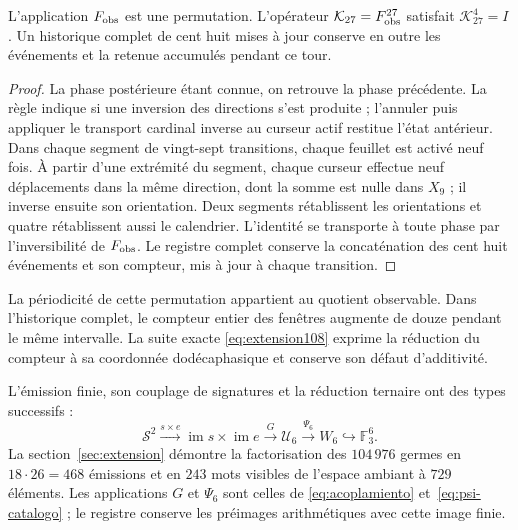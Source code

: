 \begin{proposition}
\label{ii:tpk-retorno-observable}
L'application \(F_{\rm obs}\) est une permutation. L'opérateur \(\mathcal K_{27}=F_{\rm obs}^{27}\) satisfait \(\mathcal K_{27}^{4}=I\). Un historique complet de cent huit mises à jour conserve en outre les événements et la retenue accumulés pendant ce tour.
\end{proposition}
\begin{proof}
La phase postérieure étant connue, on retrouve la phase précédente. La règle indique si une inversion des directions s'est produite ; l'annuler puis appliquer le transport cardinal inverse au curseur actif restitue l'état antérieur. Dans chaque segment de vingt-sept transitions, chaque feuillet est activé neuf fois. À partir d'une extrémité du segment, chaque curseur effectue neuf déplacements dans la même direction, dont la somme est nulle dans \(X_9\) ; il inverse ensuite son orientation. Deux segments rétablissent les orientations et quatre rétablissent aussi le calendrier. L'identité se transporte à toute phase par l'inversibilité de \(F_{\rm obs}\). Le registre complet conserve la concaténation des cent huit événements et son compteur, mis à jour à chaque transition.
\end{proof}

La périodicité de cette permutation appartient au quotient observable. Dans l'historique complet, le compteur entier des fenêtres augmente de douze pendant le même intervalle. La suite exacte \eqref{eq:extension108} exprime la réduction du compteur à sa coordonnée dodécaphasique et conserve son défaut d'additivité.






L'émission finie, son couplage de signatures et la réduction ternaire ont des types successifs :
\[
 \mathcal S^2\xrightarrow{s\times e}
 \operatorname{im}s\times\operatorname{im}e
 \xrightarrow{G}\mathcal U_6
 \xrightarrow{\Psi_6}W_6\hookrightarrow\mathbb F_3^6.
\]
La section~\ref{sec:extension} démontre la factorisation des \(104\,976\) germes en \(18\cdot26=468\) émissions et en \(243\) mots visibles de l'espace ambiant à \(729\) éléments. Les applications \(G\) et \(\Psi_6\) sont celles de \eqref{eq:acoplamiento} et~\eqref{eq:psi-catalogo} ; le registre conserve les préimages arithmétiques avec cette image finie.

